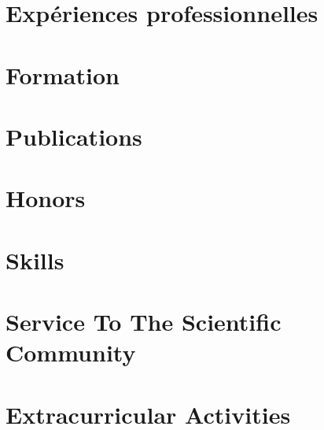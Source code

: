 \documentclass{prometheus_cv}
\begin{document}
\thispagestyle{empty}					%
\pagestyle{fancy}			 		%

\vspace*{-1cm}
\centering 


\vspace*{0.4cm}
\section{Expériences professionnelles}


\vspace*{0.4cm}
\section{Formation}


\section{Publications}


\section{Honors}
%

\section{Skills}
%


\section{Service To The Scientific Community}
%


\section{Extracurricular Activities}
%
\end{document}
